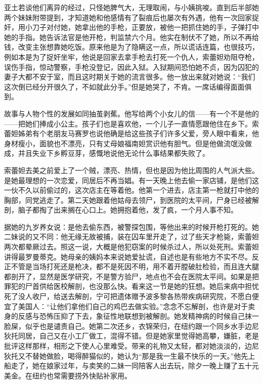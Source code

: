 \par 亚土若谈他们离异的经过，只怪她脾气大，无理取闹，与小姨挑唆。直到后半部她两个妹妹附带提到，才知道她和他感情有了裂痕后也屡次有外遇，他有一次回家捉奸，用小刀子对付她，她拿出他的手枪，正要放，被他一把抓住她的手，子弹打中她的手指。她告诉法官是他开枪，判监禁六个月。他实在制伏不了她，所以不再给钱，改变主张想靠她吃饭。原来他是为了隐瞒这一点，所以谎话连篇，也很技巧，例如本是为了捉奸坐牢，他说是回家去拿手枪去打死一个仇人，索蕾妲劝阻夺枪，误伤手指，惊动警察，手枪没登记，因此入狱。入狱期间恐怕她不贞，因为囚犯的妻子大都不安于室，而且这时期关于她的流言很多。他一放出来就对她说：“我们这次倒已经分开很久了，不如就此分手。”但是她哭了，不肯。一席话编得面面俱到。
\par 故事与人物个性的发展如同抽茧剥蕉。他写给两个小女儿的信——有一个不是他的——把她们捧成小公主。孩子们也是喜欢他，一个儿子一直情愿跟他住在乡下。索蕾妲姊弟有个老朋友马赛罗也说他确是给这些孩子们许多父爱，旁人眼中看来，他身材瘦小，面貌也不漂亮，只有丈母娘福南妲赏识他有胆气。但是他做流氓没做成，并且失业下乡孵豆芽，感慨地说他无论什么事结果都失败了。
\par 索蕾妲去美之前爱上了一个贼，漂亮、热情，但也是因为他比周围的人气派大些。是她最理想的一次恋爱，同居后不再当娼。有一天晚上他去偷一家店铺，是他们这一伙不久以前偷过的，这次店主在等着他。他第一个进去，店主第一枪就打中他的胸部，同党逃走了。第二天她跟着他姑母去领尸，到医院的太平间，尸身已经被解剖，脑子都掏了出来搁在心口上。她拥抱着他，发了疯，一个月人事不知。
\par 据她的九岁养女说：是他去偷东西，被警探包围，等他出来的时候开枪打死的。她二妹说的又不同：他无缘无故被捕，装在囚车里开走了，过了些天才枪毙，索蕾妲两次都晕厥过去。照这一说，大概是他犯窃案的时候杀过人，所以处死刑。索蕾妲讲得最罗曼蒂克。她母亲的姨妈本来说她爱扯谎，自述也是有些地方不实不尽。反正不管是当场打死还是枪决，都不是死因不明，用不着开膛破肚检验，而且连大腿都剖开了，显然是医学研究，不是警方验尸，地点也不会在医院太平间。如果是把罪犯的尸首供给医校解剖，也没那么快。看来这一节是她的狂想。她后来病中担忧死了没人收尸，给送去解剖，宁可把遗体赠予波多黎各热带疾病研究院，不愿白便宜了美国人：“让他们拿他们自己的鸡巴去做实验。”念念不忘解剖，也许是对于卖身的反感与恐怖压抑了下去，象征性地联想到被解剖。她发精神病的时候自己抹一脸屎，似乎也是谴责自己。她第二次还乡，衣锦荣归，在纽约跟一个同乡水手边尼狄托同居，自己又在小工厂做工，混得不错。但是她家里觉得她高攀，嫌脏，老是批评这样那样，相形之下使人心里难受。带来的礼物又太轻，都对她淡淡的，边尼狄托又不替她做脸，喝得醉猫似的，她认为“那是我一生最不快乐的一天。”他先上船走了，她在娘家过年，与卖笑的二妹一同陪客人出去玩，除夕一晚上赚了五十元美金。在纽约也常需要捞外快贴补家用。
